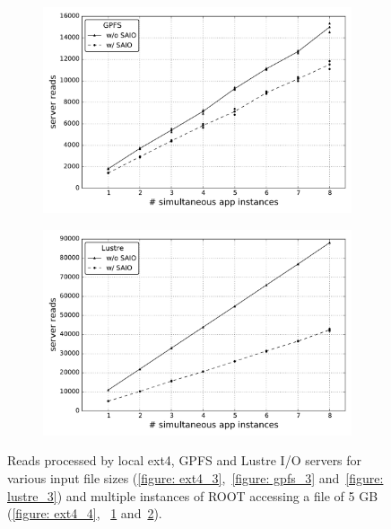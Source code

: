 \begin{figure}[!htb]
\begin{subfigure}[b]{0.32\textwidth}
    \includegraphics[width=\textwidth]{chapters/chapter2/figures/SC2015/ROOT/cluster/multiple_instances/reads_simult_instance_gpfs_test_cluster}
    \caption{\textit{}}
    \label{figure: gpfs_4}
  \end{subfigure}
  \begin{subfigure}[b]{0.32\textwidth}
    \centering
    \includegraphics[width=\textwidth]{chapters/chapter2/figures/SC2015/ROOT/cluster/multiple_instances/reads_multiple_simult_procs_Lustre_testcluster}
    \caption{\textit{}}
    \label{figure: lustre_4}
  \end{subfigure}
  \caption{Reads processed by local ext4, GPFS and Lustre I/O servers for various input file sizes (\ref{figure: ext4_3},~\ref{figure: gpfs_3} and~\ref{figure: lustre_3}) and multiple instances of ROOT accessing a file of 5 GB (\ref{figure: ext4_4},
  ~\ref{figure: gpfs_4} and~\ref{figure: lustre_4}).}
  \label{figure: read}
\end{figure}

